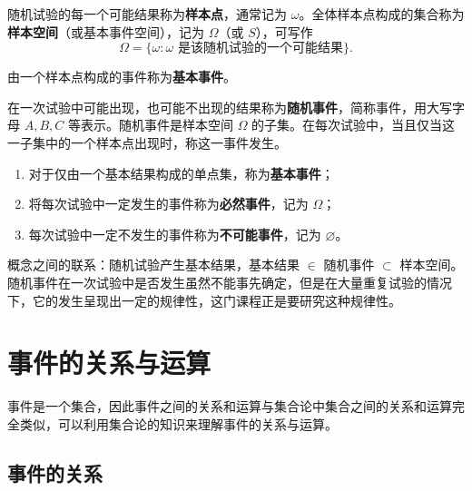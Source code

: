 ﻿\documentclass[lang=cn,11pt]{elegantbook}
\begin{document}
\begin{definition}[样本空间] \label{def:sample-space}
随机试验的每一个可能结果称为\textbf{样本点}，通常记为 \(\omega\)。全体样本点构成的集合称为\textbf{样本空间}（或基本事件空间），记为 \(\Omega\)（或 \(S\)），可写作
\[
\Omega=\{\omega:\omega \text{ 是该随机试验的一个可能结果}\}.
\]
\end{definition}

由一个样本点构成的事件称为\textbf{基本事件}。

\begin{definition}[随机事件] \label{def:random-event}
在一次试验中可能出现，也可能不出现的结果称为\textbf{随机事件}，简称事件，用大写字母 \(A, B, C\) 等表示。随机事件是样本空间 \(\Omega\) 的子集。在每次试验中，当且仅当这一子集中的一个样本点出现时，称这一事件发生。
\end{definition}

\begin{enumerate}
    \item 对于仅由一个基本结果构成的单点集，称为\textbf{基本事件}；
    \item 将每次试验中一定发生的事件称为\textbf{必然事件}，记为 \(\Omega\)；
    \item 每次试验中一定不发生的事件称为\textbf{不可能事件}，记为 \(\varnothing\)。
\end{enumerate}

\begin{note}
概念之间的联系：随机试验产生基本结果，基本结果 \(\in\) 随机事件 \(\subset\) 样本空间。随机事件在一次试验中是否发生虽然不能事先确定，但是在大量重复试验的情况下，它的发生呈现出一定的规律性，这门课程正是要研究这种规律性。
\end{note}

\section{事件的关系与运算}

事件是一个集合，因此事件之间的关系和运算与集合论中集合之间的关系和运算完全类似，可以利用集合论的知识来理解事件的关系与运算。

\subsection{事件的关系}
\end{document}
